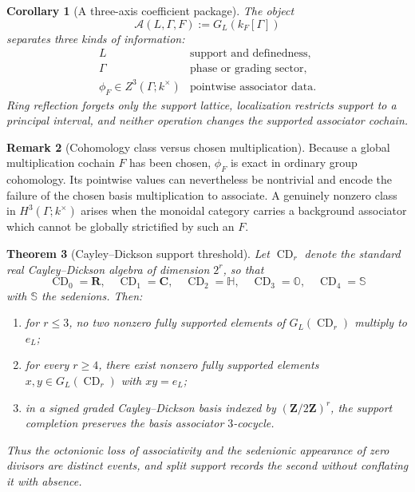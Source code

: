 \documentclass[11pt]{amsart}
\numberwithin{equation}{section}
\newtheorem{theorem}{Theorem}[section]
\newtheorem{corollary}[theorem]{Corollary}
\theoremstyle{definition}
\newtheorem{remark}[theorem]{Remark}
\newcommand{\Z}{\mathbf Z}
\newcommand{\R}{\mathbf R}
\newcommand{\C}{\mathbf C}
\newcommand{\CD}{\operatorname{CD}}
\begin{document}
\begin{corollary}[A three-axis coefficient package]
\label{cor:support-phase-associator-package}
The object
\[
\mathscr A(L,\Gamma,F):=G_L(k_F[\Gamma])
\]
separates three kinds of information:
\[
\begin{array}{c|c}
L&\text{support and definedness},\\
\Gamma&\text{phase or grading sector},\\
\phi_F\in Z^3(\Gamma;k^\times)&\text{pointwise associator data}.
\end{array}
\]
Ring reflection forgets only the support lattice, localization restricts
support to a principal interval, and neither operation changes the
supported associator cochain.
\end{corollary}

\begin{remark}[Cohomology class versus chosen multiplication]
Because a global multiplication cochain $F$ has been chosen,
$\phi_F$ is exact in ordinary group cohomology.  Its pointwise values can
nevertheless be nontrivial and encode the failure of the chosen basis
multiplication to associate.  A genuinely nonzero class in
$H^3(\Gamma;k^\times)$ arises when the monoidal category carries a
background associator which cannot be globally strictified by such an
$F$.
\end{remark}

\begin{theorem}[Cayley--Dickson support threshold]
\label{thm:cayley-dickson-support-threshold}
Let $\CD_r$ denote the standard real Cayley--Dickson algebra of dimension
$2^r$, so that
\[
\CD_0=\R,
\quad
\CD_1=\C,
\quad
\CD_2=\mathbb H,
\quad
\CD_3=\mathbb O,
\quad
\CD_4=\mathbb S
\]
with $\mathbb S$ the sedenions.  Then:
\begin{enumerate}[label=\textup{(\arabic*)}]
\item for $r\leq3$, no two nonzero fully supported elements of
$G_L(\CD_r)$ multiply to $e_L$;
\item for every $r\geq4$, there exist nonzero fully supported elements
$x,y\in G_L(\CD_r)$ with $xy=e_L$;
\item in a signed graded Cayley--Dickson basis indexed by
$(\Z/2\Z)^r$, the support completion preserves the basis associator
$3$-cocycle.
\end{enumerate}
Thus the octonionic loss of associativity and the sedenionic appearance of
zero divisors are distinct events, and split support records the second
without conflating it with absence.
\end{theorem}
\end{document}
